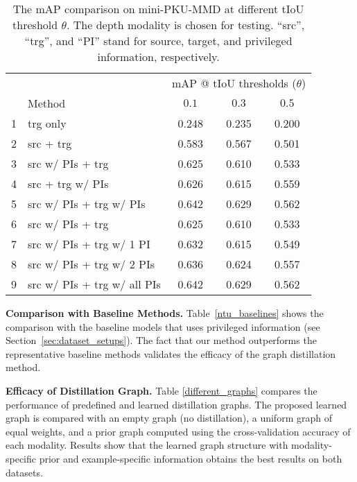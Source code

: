 \begin{table}[t]
\centering
\scriptsize
\caption{The mAP comparison on mini-PKU-MMD at different tIoU threshold $\theta$. The depth modality is chosen for testing. ``src'', ``trg'', and ``PI'' stand for source, target, and privileged information, respectively.}
\label{pku_mmd_baselines}
\begin{tabular}{c@{\hskip 0.2in}l@{\hskip 0.4in}c@{\hskip 0.4in}c@{\hskip 0.4in}c}
\toprule
\multicolumn{2}{c}{} & \multicolumn{3}{c}{mAP @ tIoU thresholds ($\theta$)} \\
\cmidrule(r){3-5}
 & Method & $0.1$ & $0.3$ & $0.5$ \\
\midrule
1&trg only & 0.248 & 0.235 & 0.200 \\
2&src + trg & 0.583 & 0.567 & 0.501 \\
3&src w/ PIs + trg & 0.625 & 0.610 & 0.533 \\
4&src + trg w/ PIs & 0.626 & 0.615 & 0.559 \\
5&src w/ PIs + trg w/ PIs & 0.642 & 0.629 & 0.562 \\
\midrule
6&src w/ PIs + trg & 0.625 & 0.610 & 0.533  \\
7&src w/ PIs + trg w/ 1 PI & 0.632 & 0.615 & 0.549 \\
8&src w/ PIs + trg w/ 2 PIs & 0.636 & 0.624 & 0.557 \\
9&src w/ PIs + trg w/ all PIs & 0.642 & 0.629 & 0.562 \\
\bottomrule
\end{tabular}
\end{table}



\noindent\textbf{Comparison with Baseline Methods.} Table~\ref{ntu_baselines} shows the comparison with the baseline models that uses privileged information (see Section~\ref{sec:dataset_setups}). The fact that our method outperforms the representative baseline methods validates the efficacy of the graph distillation method.

\noindent\textbf{Efficacy of Distillation Graph.} Table \ref{different_graphs} compares the performance of predefined and learned distillation graphs. The proposed learned graph is compared with an empty graph (no distillation), a uniform graph of equal weights, and a prior graph computed using the cross-validation accuracy of each modality. Results show that the learned graph structure with modality-specific prior and example-specific information obtains the best results on both datasets.



